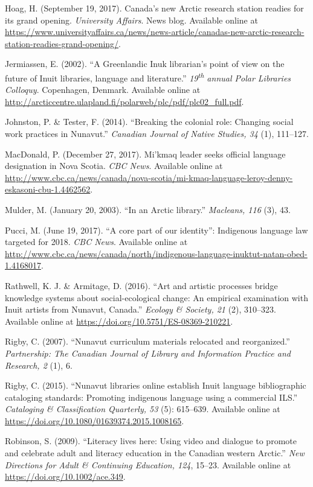 \documentclass[a4paper,
fontsize=11pt,
oneside,
numbers=noperiodatend,
parskip=half-,
bibliography=totoc,
final
]{scrartcl}
\begin{document}
Hoag, H. (September 19, 2017). Canada's new Arctic research station
readies for its grand opening. \emph{University Affairs}. News blog.
Available online at
\url{https://www.universityaffairs.ca/news/news-article/canadas-new-arctic-research-station-readies-grand-opening/}.

Jermiassen, E. (2002). \enquote{A Greenlandic Inuk librarian's point of
view on the future of Inuit libraries, language and literature.}
\emph{19\textsuperscript{th} annual Polar Libraries Colloquy}.
Copenhagen, Denmark. Available online at
\url{http://arcticcentre.ulapland.fi/polarweb/plc/pdf/plc02_full.pdf}.

Johnston, P. \& Tester, F. (2014). \enquote{Breaking the colonial role:
Changing social work practices in Nunavut.} \emph{Canadian Journal of
Native Studies, 34} (1), 111--127.

MacDonald, P. (December 27, 2017). Mi'kmaq leader seeks official
language designation in Nova Scotia. \emph{CBC News}. Available online
at
\url{http://www.cbc.ca/news/canada/nova-scotia/mi-kmaq-language-leroy-denny-eskasoni-cbu-1.4462562}.

Mulder, M. (January 20, 2003). \enquote{In an Arctic library.}
\emph{Macleans, 116} (3), 43.

Pucci, M. (June 19, 2017). \enquote{A core part of our identity}:
Indigenous language law targeted for 2018. \emph{CBC News}. Available
online at
\url{http://www.cbc.ca/news/canada/north/indigenous-language-inuktut-natan-obed-1.4168017}.

Rathwell, K. J. \& Armitage, D. (2016). \enquote{Art and artistic
processes bridge knowledge systems about social-ecological change: An
empirical examination with Inuit artists from Nunavut, Canada.}
\emph{Ecology \& Society, 21} (2), 310--323. Available online at
\url{https://doi.org/10.5751/ES-08369-210221}.

Rigby, C. (2007). \enquote{Nunavut curriculum materials relocated and
reorganized.} \emph{Partnership: The Canadian Journal of Library and
Information Practice and Research, 2} (1), 6.

Rigby, C. (2015). \enquote{Nunavut libraries online establish Inuit
language bibliographic cataloging standards: Promoting indigenous
language using a commercial ILS.} \emph{Cataloging \& Classification
Quarterly, 53} (5): 615--639. Available online at
\url{https://doi.org/10.1080/01639374.2015.1008165}.

Robinson, S. (2009). \enquote{Literacy lives here: Using video and
dialogue to promote and celebrate adult and literacy education in the
Canadian western Arctic.} \emph{New Directions for Adult \& Continuing
Education, 124}, 15--23. Available online at
\url{https://doi.org/10.1002/ace.349}.
\end{document}
